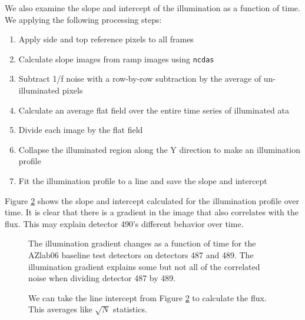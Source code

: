 \documentclass{aastex62}
\begin{document}
We also examine the slope and intercept of the illumination as a function of time.
We applying the following processing steps:
\begin{enumerate}
	\item Apply side and top reference pixels to all frames
	\item	Calculate slope images from ramp images using \texttt{ncdas}
	\item Subtract 1/f noise with a row-by-row subtraction by the average of un-illuminated pixels
	\item Calculate an average flat field over the entire time series of illuminated ata
	\item Divide each image by the flat field
	\item Collapse the illuminated region along the Y direction to make an illumination profile
	\item Fit the illumination profile to a line and save the slope and intercept
\end{enumerate}
Figure \ref{fig:illumGradientChangeOverTime} shows the slope and intercept calculated for the illumination profile over time.
It is clear that there is a gradient in the image that also correlates with the flux.
This may explain detector 490's different behavior over time.

\begin{figure}
\caption{The illumination gradient changes as a function of time for the AZlab06 baseline test detectors on detectors 487 and 489.
The illumination gradient explains some but not all of the correlated noise when dividing detector 487 by 489.}\label{fig:illumGradientChangeOverTime}
\end{figure}

\begin{figure}
\caption{We can take the line intercept from Figure \ref{fig:illumGradientChangeOverTime} to calculate the flux.
This averages like $\sqrt{N}$ statistics.
}\label{fig:illumGradientChangeOverTime}
\end{figure}


\clearpage
\end{document}
